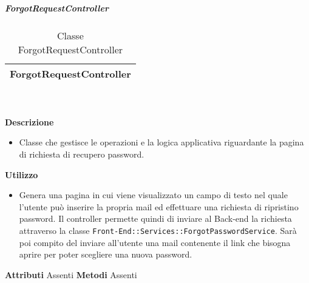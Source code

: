 			\subparagraph{ForgotRequestController} 
\begin{table}[ht]
\begin{center}
\bgroup
	\setlength{\arrayrulewidth}{0.6mm}
	\def\arraystretch{1}
		\begin{tabular}{ | p{12cm} | }
				\hline  
					\centerline{\textbf{ForgotRequestController}}
		\\ \hline 
				\hline
				\hline
		
		\end{tabular}
\egroup
\caption{Classe ForgotRequestController}
\end{center}
\end{table} \textbf{\\ \\ Descrizione}
\begin{itemize}
\item[] Classe che gestisce le operazioni e la logica applicativa riguardante la pagina di richiesta di recupero password.
\end{itemize} 
\textbf{Utilizzo}
\begin{itemize}
\item[] Genera una pagina in cui viene visualizzato un campo di testo nel quale l'utente può inserire la propria mail ed effettuare una richiesta di ripristino password. Il controller permette quindi di inviare al Back-end la richiesta attraverso la classe \texttt{Front-End::Services::ForgotPasswordService}. Sarà poi compito del  inviare all'utente una mail contenente il link che bisogna aprire per poter scegliere una nuova password.
\end{itemize}
\textbf{Attributi}
Assenti
\textbf{Metodi}
Assenti

